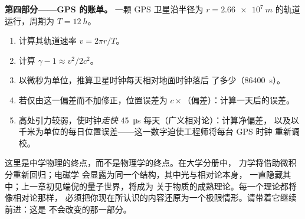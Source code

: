 \begin{problem}
\medskip
\noindent\textbf{第四部分——GPS 的账单。}
一颗 GPS 卫星沿半径为 $r = \qty{2.66e7}{m}$ 的轨道运行，周期为 $T = \qty{12}{h}$。
\begin{enumerate}[resume]
  \item 计算其轨道速率 $v = 2\pi r/T$。
  \item 计算 $\gamma - 1 \approx v^2/2c^2$。
  \item 以微秒为单位，推算卫星时钟每天相对地面时钟落后
        了多少（\qty{86400}{s}）。
  \item 若仅由这一偏差而不加修正，位置误差为
        $c \times$（偏差）：计算一天后的误差。
  \item 高处引力较弱，使时钟\emph{走快}
        \qty{45}{\micro s} 每天（广义相对论）：计算净偏差，
        以及以千米为单位的每日位置误差——这一数字迫使工程师将每台 GPS 时钟
        重新调校。
\end{enumerate}
\end{problem}

\bigskip
\noindent
这里是中学物理的终点，而不是物理学的终点。在大学分册中，
力学将借助微积分重新回归；电磁学
会显露为同一个结构，其中光与相对论本身，
一直隐藏其中；上一章初见端倪的量子世界，将成为
关于物质的成熟理论。每一个理论都将像相对论那样，
必须把你现在所认识的内容还原为一个极限情形。请带着它继续前进：这是
不会改变的那一部分。
